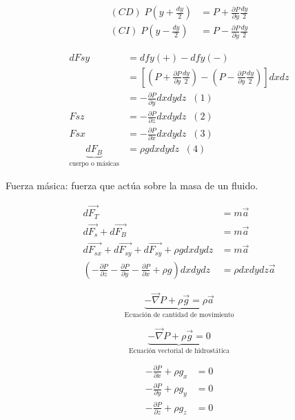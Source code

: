 
\[
    \begin{split}
        (CD) \; P(y + \frac{ dy }{ 2 }) & = P + \frac{ \partial P }{ \partial y } \frac{ dy }{ 2 } \\
        (CI) \; P(y - \frac{ dy }{ 2 }) & = P - \frac{ \partial P }{ \partial y } \frac{ dy }{ 2 }
     \end{split}
\]

\[
    \begin{split}
        dFsy & = dfy (+) - dfy(-) \\
        & = [ ( P + \frac{ \partial P }{ \partial y } \frac{ dy }{ 2 } ) - ( P - \frac{ \partial P }{ \partial y } \frac{ dy }{ 2 } ) ] dxdz \\
        & = - \frac{ \partial P }{ \partial y } dx dy dz \;\; (1) \\
        Fsz & = - \frac{ \partial P }{ \partial z } dx dy dz \;\; (2) \\
        Fsx & = - \frac{ \partial P }{ \partial x } dx dy dz \;\; (3) \\
        \underbrace{ dF_{B} }_{ \text{cuerpo o másicas} } & = \rho g dx dy dz \;\; (4)
    \end{split}
\]

Fuerza másica: fuerza que actúa sobre la masa de un fluido.

\[
    \begin{split}
        d\Vec{ F_{T} } & = m\Vec{ a } \\
        d\Vec{ F_{s} } + d\Vec{ F_{B} } & = m\Vec{ a } \\
        d\Vec{ F_{sx} } +d\Vec{ F_{sy} } + d\Vec{ F_{sy} } + \rho g dx dy dz & = m\Vec{ a } \\
        ( -\frac{ \partial P }{ \partial z } -\frac{ \partial P }{ \partial y } -\frac{ \partial P }{ \partial x } + \rho g ) dx dy dz & = \rho dx dy dz \Vec{ a }
    \end{split}
\]

\[
    \underbrace{ -\Vec{ \nabla } P + \rho \Vec{ g } = \rho \Vec{ a }}_{ \text{Ecuación de cantidad de movimiento} }
\]

\[
    \underbrace{ -\Vec{ \nabla } P + \rho \Vec{ g } = 0 }_{ \text{Ecuación vectorial de hidrostática} }
\]

\[
    \begin{split}
        - \frac{ \partial P }{ \partial x } + \rho g_{x} & = 0 \\
        - \frac{ \partial P }{ \partial y } + \rho g_{y} & = 0 \\
        - \frac{ \partial P }{ \partial z } + \rho g_{z} & = 0 \\
    \end{split}
\]

